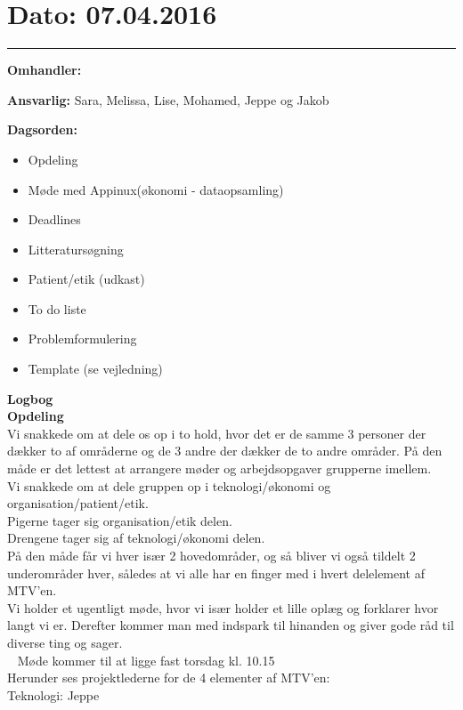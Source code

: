 \section{Dato: 07.04.2016}
\hrule

\textbf{Omhandler:}

\textbf{Ansvarlig:} Sara, Melissa, Lise, Mohamed, Jeppe og Jakob

\textbf{Dagsorden:}
\begin{itemize}
	\item Opdeling
	\item Møde med Appinux(økonomi - dataopsamling)
	\item Deadlines
	\item Litteratursøgning
	\item Patient/etik (udkast)
	\item To do liste
	\item Problemformulering
	\item Template (se vejledning)
\end{itemize}

\textbf{Logbog}
\\


\textbf{Opdeling}
\\
Vi snakkede om at dele os op i to hold, hvor det er de samme 3 personer der dækker to af områderne og de 3 andre der dækker de to andre områder. På den måde er det lettest at arrangere møder og arbejdsopgaver grupperne imellem.\\
Vi snakkede om at dele gruppen op i teknologi/økonomi og organisation/patient/etik.\\
Pigerne tager sig organisation/etik delen.\\
Drengene tager sig af teknologi/økonomi delen.\\
På den måde får vi hver især 2 hovedområder, og så bliver vi også tildelt 2 underområder hver, således at vi alle har en finger med i hvert delelement af MTV'en. \\
Vi holder et ugentligt møde, hvor vi især holder et lille oplæg og forklarer hvor langt vi er. Derefter kommer man med indspark til hinanden og giver gode råd til diverse ting og sager.\\ 
Møde kommer til at ligge fast torsdag kl. 10.15\\

Herunder ses projektlederne for de 4 elementer af MTV'en: \\
Teknologi:
Jeppe\\

